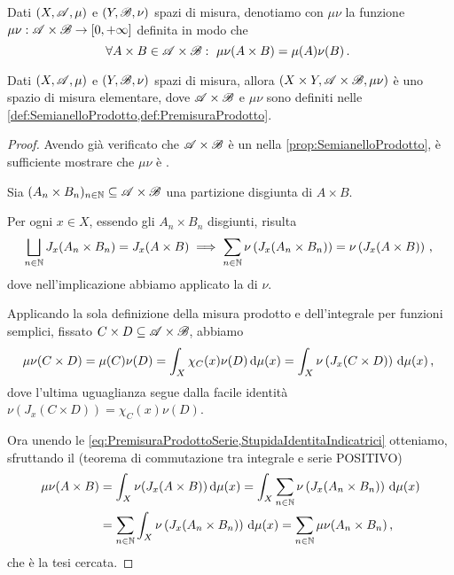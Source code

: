 \begin{definition}\label{def:PremisuraProdotto}
	Dati $(X,\mathscr A,\mu)$ e $(Y,\mathscr B,\nu)$ spazi di misura, denotiamo con $\mu\nu$ la funzione $\mu\nu:\mathscr A\times\mathscr B\to[0,+\infty]$ definita in modo che 
	\begin{equation*}
		\forall A\times B\in\mathscr A\times\mathscr B:\ \mu\nu(A\times B)=\mu(A)\nu(B)\, \text{. }
	\end{equation*}
\end{definition}

\begin{theorem}\label{thm:PremisuraProdotto}
	Dati $(X,\mathscr A,\mu)$ e $(Y,\mathscr B,\nu)$ spazi di misura, allora $(X\times Y,\mathscr A\times\mathscr B,\mu\nu)$ è uno spazio di misura elementare, dove $\mathscr A\times\mathscr B$ e $\mu\nu$ sono definiti nelle \cref{def:SemianelloProdotto,def:PremisuraProdotto}.
\end{theorem}
\begin{proof}
	Avendo già verificato che $\mathscr A\times\mathscr B$ è un \semiring{} nella \cref{prop:SemianelloProdotto}, è sufficiente mostrare che $\mu\nu$ è \sigadd{}.
	
	Sia $(A_n\times B_n)_{n\in\mathbb N}\subseteq \mathscr A\times \mathscr B$ una partizione disgiunta di $A\times B$.
	
	Per ogni $x\in X$, essendo gli $A_n\times B_n$ disgiunti, risulta
	\begin{equation}\label{eq:PremisuraProdottoSerie}
		\bigsqcup_{n\in\mathbb N} J_x(A_n\times B_n) = J_x(A\times B)  \implies \sum_{n\in\mathbb N}\nu\left(J_x(A_n\times B_n)\right)=\nu\left(J_x(A\times B)\right)\, \text{, }
	\end{equation}
	dove nell'implicazione abbiamo applicato la \sigadd[ità] di $\nu$.
	
	Applicando la sola definizione della misura prodotto e dell'integrale per funzioni semplici, fissato $C\times D\subseteq \mathscr A\times\mathscr B$, abbiamo
	\begin{equation}\label{StupidaIdentitaIndicatrici}
		\mu\nu(C\times D)=\mu(C)\nu(D)=\int_{X}\chi_C(x)\nu(D)\,\mathrm d \mu(x)=\int_X \nu\left(J_x(C\times D)\right)\,\mathrm d\mu(x)\, \text{, }
	\end{equation}
	dove l'ultima uguaglianza segue dalla facile identità $\nu\left(J_x(C\times D)\right)=\chi_C(x)\nu(D)$.
	
	Ora unendo le \cref{eq:PremisuraProdottoSerie,StupidaIdentitaIndicatrici} otteniamo, sfruttando il (teorema di commutazione tra integrale e serie POSITIVO)
	\begin{align*}
		\mu\nu(A\times B)&=\int_X\nu(J_x(A\times B))\,\mathrm d \mu(x)=\int_X\sum_{n\in\mathbb N}\nu\left(J_x(A_n\times B_n)\right)\,\mathrm d\mu(x)\\
		&=\sum_{n\in\mathbb N}\int_X\nu\left(J_x(A_n\times B_n)\right)\,\mathrm d\mu(x)=\sum_{n\in\mathbb N}\mu\nu(A_n\times B_n)\, \text{, }
	\end{align*}
	che è la tesi cercata.
\end{proof}

